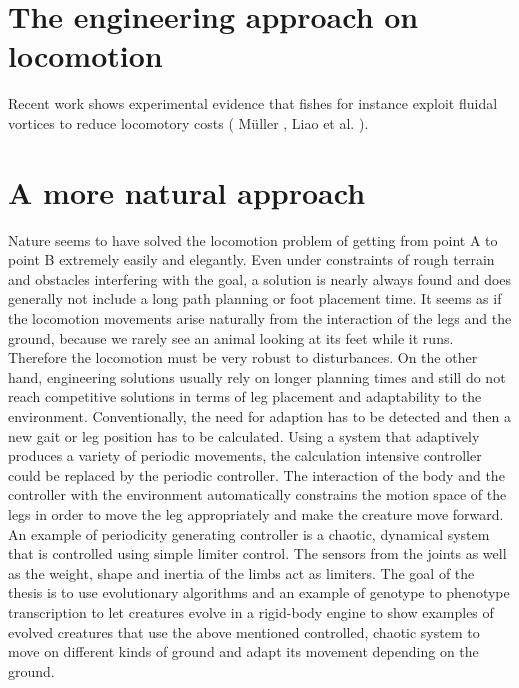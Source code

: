 \documentclass[main]{subfiles}
\begin{document}
\section{The engineering approach on locomotion}


Recent work shows experimental evidence that fishes for instance exploit fluidal vortices to reduce locomotory costs ( Müller \cite{bib:Muller2003}, Liao et al. \cite{bib:Liao2003a,bib:Liao2003b}).


\section{A more natural approach}

Nature seems to have solved the locomotion problem of getting from point A to point B extremely easily and elegantly. Even under constraints of rough terrain and obstacles interfering with the goal, a solution is nearly always found and does generally not include a long path planning or foot placement time. It seems as if the locomotion movements arise naturally from the interaction of the legs and the ground, because we rarely see an animal looking at its feet while it runs. Therefore the locomotion must be very robust to disturbances. On the other hand, engineering solutions usually rely on longer planning times and still do not reach competitive solutions in terms of leg placement and adaptability to the environment. Conventionally, the need for adaption has to be detected and then a new gait or leg position has to be calculated. Using a system that adaptively produces a variety of periodic movements, the calculation intensive controller could be replaced by the periodic controller. The interaction of the body and the controller with the environment automatically constrains the motion space of the legs in order to move the leg appropriately and make the creature move forward. An example of periodicity generating controller is a chaotic, dynamical system that is controlled using simple limiter control. The sensors from the joints as well as the weight, shape and inertia of the limbs act as limiters. The goal of the thesis is to use evolutionary algorithms and an example of genotype to phenotype transcription to let creatures evolve in a rigid-body engine to show examples of evolved creatures that use the above mentioned controlled, chaotic system to move on different kinds of ground and adapt its movement depending on the ground.
\end{document}
